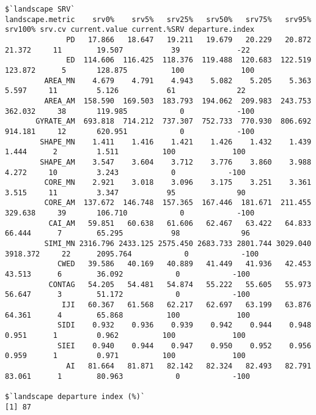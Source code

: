 \begin{verbatim}
$`landscape SRV`
landscape.metric    srv0%    srv5%   srv25%   srv50%   srv75%   srv95%  srv100% srv.cv current.value current.%SRV departure.index
              PD   17.866   18.647   19.211   19.679   20.229   20.872   21.372     11        19.507           39             -22
              ED  114.606  116.425  118.376  119.488  120.683  122.519  123.872      5       128.875          100             100
         AREA_MN    4.679    4.791    4.943    5.082    5.205    5.363    5.597     11         5.126           61              22
         AREA_AM  158.590  169.503  183.793  194.062  209.983  243.753  362.032     38       119.985            0            -100
       GYRATE_AM  693.818  714.212  737.307  752.733  770.930  806.692  914.181     12       620.951            0            -100
        SHAPE_MN    1.411    1.416    1.421    1.426    1.432    1.439    1.444      2         1.511          100             100
        SHAPE_AM    3.547    3.604    3.712    3.776    3.860    3.988    4.272     10         3.243            0            -100
         CORE_MN    2.921    3.018    3.096    3.175    3.251    3.361    3.515     11         3.347           95              90
         CORE_AM  137.672  146.748  157.365  167.446  181.671  211.455  329.638     39       106.710            0            -100
          CAI_AM   59.851   60.638   61.606   62.467   63.422   64.833   66.444      7        65.295           98              96
         SIMI_MN 2316.796 2433.125 2575.450 2683.733 2801.744 3029.040 3918.372     22      2095.764            0            -100
            CWED   39.586   40.169   40.889   41.449   41.936   42.453   43.513      6        36.092            0            -100
          CONTAG   54.205   54.481   54.874   55.222   55.605   55.973   56.647      3        51.172            0            -100
             IJI   60.367   61.568   62.217   62.697   63.199   63.876   64.361      4        65.868          100             100
            SIDI    0.932    0.936    0.939    0.942    0.944    0.948    0.951      1         0.962          100             100
            SIEI    0.940    0.944    0.947    0.950    0.952    0.956    0.959      1         0.971          100             100
              AI   81.664   81.871   82.142   82.324   82.493   82.791   83.061      1        80.963            0            -100

$`landscape departure index (%)`
[1] 87
\end{verbatim}

